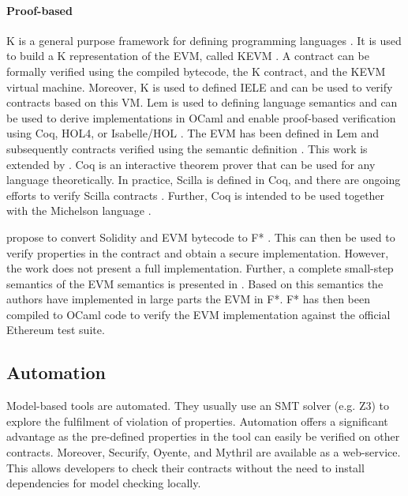 \paragraph{Proof-based}
K is a general purpose framework for defining programming languages \cite{Rosu2007}. It is used to build a K representation of the EVM, called KEVM \cite{Hildenbrandt2017}. 
A contract can be formally verified using the compiled bytecode, the K contract, and the KEVM virtual machine. Moreover, K is used to defined IELE \cite{Kasampalis2018} and can be used to verify contracts based on this VM.
Lem is used to defining language semantics and can be used to derive implementations in OCaml and enable proof-based verification using Coq, HOL4, or Isabelle/HOL \cite{Mulligan2014}. The EVM has been defined in Lem and subsequently contracts verified using the semantic definition \cite{Hirai2017}. This work is extended by \cite{Amani2018}. 
Coq is an interactive theorem prover that can be used for any language theoretically. In practice, Scilla is defined in Coq, and there are ongoing efforts to verify Scilla contracts \cite{Sergey2018}. Further, Coq is intended to be used together with the Michelson language \cite{DynamicLedgerSolutions2017}.

\citeauthor{Bhargavan2016} propose to convert Solidity and EVM bytecode to F* \cite{Bhargavan2016}. This can then be used to verify properties in the contract and obtain a secure implementation. However, the work does not present a full implementation.
Further, a complete small-step semantics of the EVM semantics is presented in \cite{Grishchenko2018}. Based on this semantics the authors have implemented in large parts the EVM in F*. F* has then been compiled to OCaml code to verify the EVM implementation against the official Ethereum test suite.

\subsection{Automation} 
Model-based tools are automated. They usually use an SMT solver (e.g. Z3) to explore the fulfilment of violation of properties. Automation offers a significant advantage as the pre-defined properties in the tool can easily be verified on other contracts. Moreover, Securify, Oyente, and Mythril are available as a web-service. This allows developers to check their contracts without the need to install dependencies for model checking locally.

